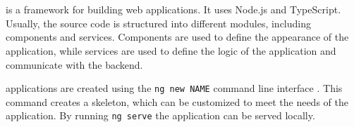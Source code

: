 \section{\angular{}}\label{sec:FE_angular}

\angular{} is a framework for building web applications.
It uses Node.js and TypeScript.
Usually, the source code is structured into different modules, including components and services.
Components are used to define the appearance of the application, while
services are used to define the logic of the application and communicate with the backend.

\angular{} applications are created using the \texttt{ng new NAME} command line interface \cite{angular_book2018}.
This command creates a skeleton, which can be customized to meet the needs of the application.
By running \texttt{ng serve} the application can be served locally.